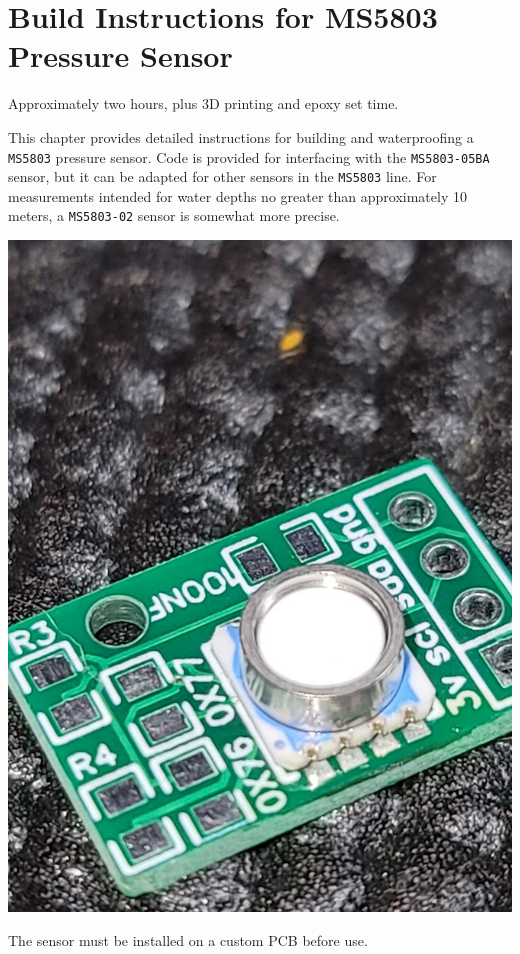 %
  \setchapterpreamble[u]{\margintoc}
  \chapter{Build Instructions for MS5803 Pressure Sensor}

  \begin{kaobox}[backgroundcolor=\SNcolor,frametitlebackgroundcolor=\SNcolor,frametitle=Estimated build time] Approximately two hours, plus 3D printing and epoxy set time.
  \end{kaobox}

  This chapter provides detailed instructions for building and waterproofing a \texttt{MS5803} pressure sensor. Code is provided for interfacing with the \texttt{MS5803-05BA} sensor, but it can be adapted for other sensors in the \texttt{MS5803} line. For measurements intended for water depths no greater than approximately 10 meters, a \texttt{MS5803-02} sensor is somewhat more precise.


  \begin{marginfigure}[1cm]
  	\begin{center}
      \includegraphics[width=\MFW]{Images/AppendixB_PCB2.jpg}
  		\caption[\texttt{MS5803-05} on PCB]{The sensor must be installed on a custom PCB before use.}
  	\end{center}
  \end{marginfigure}

